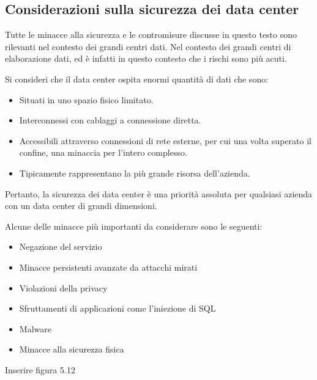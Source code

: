 \subsection{Considerazioni sulla sicurezza dei data center}
Tutte le minacce alla sicurezza e le contromisure discusse in questo testo sono rilevanti nel contesto dei grandi centri dati. Nel contesto dei grandi centri di elaborazione dati, ed è infatti in questo contesto che i rischi
sono più acuti.

\singlespacing

Si consideri che il data center ospita enormi quantità di dati che sono:

\begin{itemize}
    \item Situati in uno spazio fisico limitato.
    
    \item Interconnessi con cablaggi a connessione diretta.
    
    \item Accessibili attraverso connessioni di rete esterne, per cui una volta superato il confine, una  minaccia per l'intero complesso.
    
    \item Tipicamente rappresentano la più grande risorsa dell'azienda.
\end{itemize}
Pertanto, la sicurezza dei data center è una priorità assoluta per qualsiasi azienda con un data center di grandi dimensioni.

\singlespacing

Alcune delle minacce più importanti da considerare sono le seguenti:
\begin{itemize}
    \item Negazione del servizio
    
    \item Minacce persistenti avanzate da attacchi mirati
    
    \item Violazioni della privacy
    
    \item Sfruttamenti di applicazioni come l'iniezione di SQL
    
    \item Malware
    
    \item Minacce alla sicurezza fisica
\end{itemize}

Inserire figura 5.12


